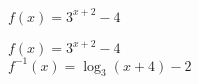 {$f(x) = 3^{x + 2} - 4$}
{$f(x) = 3^{x + 2} - 4$\\
$f^{-1}(x) = \log_{3}(x + 4) - 2$\\

\begin{center}
\end{center}}